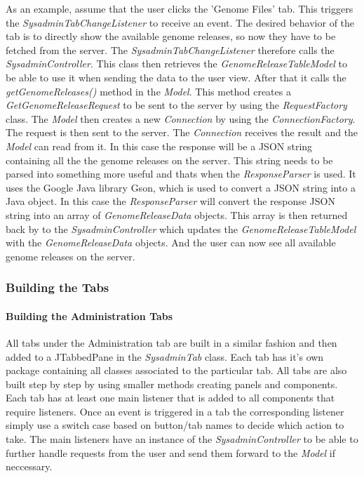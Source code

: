 As an example, assume that the user clicks the 'Genome Files' tab.
This triggers the \textit{SysadminTabChangeListener} to receive an event. The desired behavior of the tab is to directly show the available genome releases, so now they  have to be fetched from the server. The \textit{SysadminTabChangeListener} therefore calls the \textit{SysadminController}.
This class then retrieves the \textit{GenomeReleaseTableModel} to be able to use it when sending the data to the user view.  After that it calls the \textit{getGenomeReleases()} method in the \textit{Model}. This method creates a \textit{GetGenomeReleaseRequest} to be sent to the server by using the \textit{RequestFactory} class. The \textit{Model} then creates a new \textit{Connection} by using the \textit{ConnectionFactory}. The request is then sent to the server. The \textit{Connection} receives the result and the \textit{Model} can read from it. In this case the response will be a JSON string containing all the the genome releases on the server. This string needs to be parsed into something more useful and thats when the \textit{ResponseParser} is used. It uses the Google Java library Gson, which is used to convert a JSON string into a Java object. In this case the \textit{ResponseParser} will convert the response JSON string into an array of \textit{GenomeReleaseData} objects. This array is then returned back by to the \textit{SysadminController} which updates the \textit{GenomeReleaseTableModel} with the \textit{GenomeReleaseData} objects. And the user can now see all available genome releases on the server.

\subsubsection{Building the Tabs}
\label{Building the Tabs}

\paragraph{Building the Administration Tabs}
\label{Building the Administration Tabs}

All tabs under the Administration tab are built in a similar fashion and then added to a
JTabbedPane in the \textit{SysadminTab} class. Each tab has it’s own package containing 
all classes associated to the particular tab. All tabs are also built step by step by 
using smaller methods creating panels and components. Each tab has at least one main 
listener that is added to all components that require listeners. Once an event is triggered 
in a tab the corresponding listener simply use a switch case based on button/tab names 
to decide which action to take. The main listeners have an instance of the \textit{SysadminController }
to be able to further handle requests from the user and send them forward to the \textit{Model} if neccessary.

